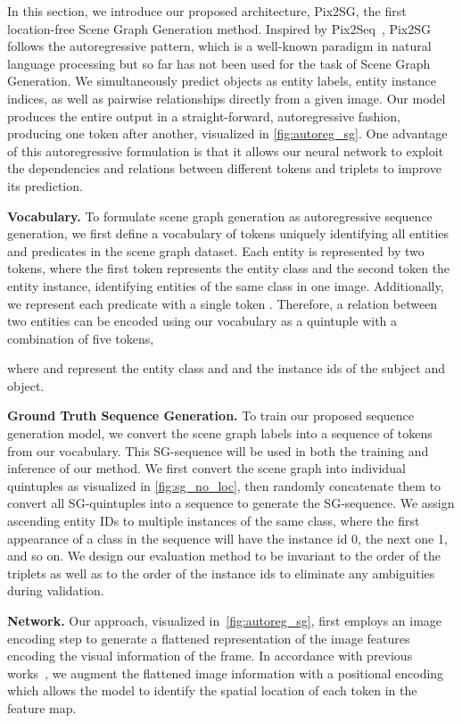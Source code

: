 \documentclass[10pt,twocolumn,letterpaper]{article}
\begin{document}
In this section, we introduce our proposed architecture, Pix2SG, the first location-free Scene Graph Generation method.
Inspired by Pix2Seq~\cite{chen_pix2seq_2022}, Pix2SG follows the autoregressive pattern, which is a well-known paradigm in natural language processing but so far has not been used for the task of Scene Graph Generation. We simultaneously predict objects as entity labels, entity instance indices, as well as pairwise relationships directly from a given image. Our model produces the entire output in a straight-forward, autoregressive fashion, producing one token after another, visualized in \cref{fig:autoreg_sg}. One advantage of this autoregressive formulation is that it allows our neural network to exploit the dependencies and relations between different tokens and triplets to improve its prediction. 

\noindent\textbf{Vocabulary.} To formulate scene graph generation as autoregressive sequence generation, we first define a vocabulary of tokens uniquely identifying all entities and predicates in the scene graph dataset. Each entity is represented by two tokens, where the first token represents the entity class and the second token the entity instance, identifying entities of the same class in one image. Additionally, we represent each predicate with a single token . Therefore, a relation between two entities can be encoded using our vocabulary as a quintuple with a combination of five tokens, 

where  and  represent the entity class and  and  the instance ids of the subject and object. 

\noindent\textbf{Ground Truth Sequence Generation.} 
To train our proposed sequence generation model, we convert the scene graph labels  into a sequence of tokens from our vocabulary. This SG-sequence will be used in both the training and inference of our method.
We first convert the scene graph into individual quintuples as visualized in \cref{fig:sg_no_loc}, then randomly concatenate them to convert all SG-quintuples into a sequence to generate the SG-sequence. We assign ascending entity IDs to multiple instances of the same class, where the first appearance of a class in the sequence will have the instance id 0, the next one 1, and so on. We design our evaluation method to be invariant to the order of the triplets as well as to the order of the instance ids to eliminate any ambiguities during validation.

\noindent\textbf{Network.} Our approach, visualized in~\cref{fig:autoreg_sg}, first employs an image encoding step to generate a flattened representation of the image features encoding the visual information of the frame. In accordance with previous works~\cite{chen_pix2seq_2022}, we augment the flattened image information with a positional encoding which allows the model to identify the spatial location of each token in the feature map.
\end{document}
